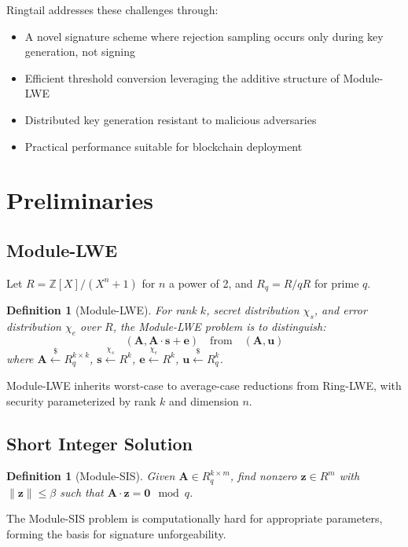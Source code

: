 \documentclass[11pt,a4paper]{article}
\newtheorem{definition}[theorem]{Definition}
\begin{document}
Ringtail addresses these challenges through:
\begin{itemize}
    \item A novel signature scheme where rejection sampling occurs only during key generation, not signing
    \item Efficient threshold conversion leveraging the additive structure of Module-LWE
    \item Distributed key generation resistant to malicious adversaries
    \item Practical performance suitable for blockchain deployment
\end{itemize}

\section{Preliminaries}

\subsection{Module-LWE}

Let $R = \mathbb{Z}[X]/(X^n + 1)$ for $n$ a power of 2, and $R_q = R/qR$ for prime $q$.

\begin{definition}[Module-LWE]
For rank $k$, secret distribution $\chi_s$, and error distribution $\chi_e$ over $R$, the Module-LWE problem is to distinguish:
\[
(\mathbf{A}, \mathbf{A} \cdot \mathbf{s} + \mathbf{e}) \quad \text{from} \quad (\mathbf{A}, \mathbf{u})
\]
where $\mathbf{A} \xleftarrow{\$} R_q^{k \times k}$, $\mathbf{s} \xleftarrow{\chi_s} R^k$, $\mathbf{e} \xleftarrow{\chi_e} R^k$, $\mathbf{u} \xleftarrow{\$} R_q^k$.
\end{definition}

Module-LWE inherits worst-case to average-case reductions from Ring-LWE, with security parameterized by rank $k$ and dimension $n$.

\subsection{Short Integer Solution}

\begin{definition}[Module-SIS]
Given $\mathbf{A} \in R_q^{k \times m}$, find nonzero $\mathbf{z} \in R^m$ with $\|\mathbf{z}\| \leq \beta$ such that $\mathbf{A} \cdot \mathbf{z} = \mathbf{0} \mod q$.
\end{definition}

The Module-SIS problem is computationally hard for appropriate parameters, forming the basis for signature unforgeability.
\end{document}
